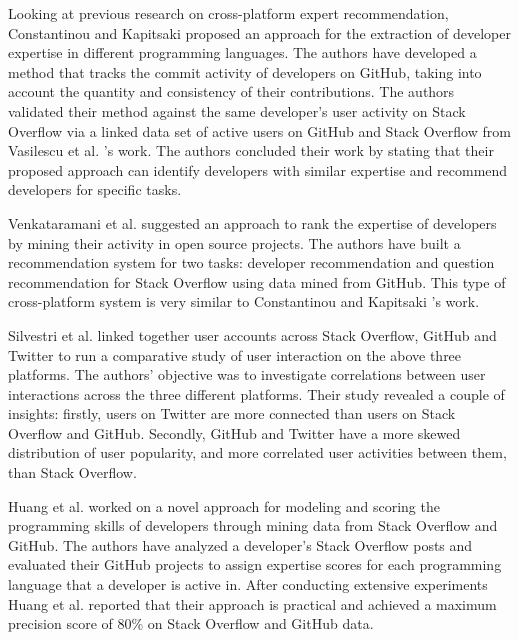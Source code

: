         Looking at previous research on cross-platform expert recommendation, Constantinou and Kapitsaki \cite{constantinou2016identifying} proposed an approach for the extraction of developer expertise in different programming languages. The authors have developed a method that tracks the commit activity of developers on GitHub, taking into account the quantity and consistency of their contributions. The authors validated their method against the same developer’s user activity on Stack Overflow via a linked data set of active users on GitHub and Stack Overflow from Vasilescu et al. \cite{vasilescu2013stackoverflow}'s work. The authors concluded their work by stating that their proposed approach can identify developers with similar expertise and recommend developers for specific tasks.
        
        Venkataramani et al. \cite{venkataramani2013discovery} suggested an approach to rank the expertise of developers by mining their activity in open source projects. The authors have built a recommendation system for two tasks: developer recommendation and question recommendation for Stack Overflow using data mined from GitHub. This type of cross-platform system is very similar to Constantinou and Kapitsaki \cite{constantinou2016identifying}'s work. 
    
        Silvestri et al. \cite{silvestri2015linking} linked together user accounts across Stack Overflow, GitHub and Twitter to run a comparative study of user interaction on the above three platforms. The authors' objective was to investigate correlations between user interactions across the three different platforms. Their study revealed a couple of insights: firstly, users on Twitter are more connected than users on Stack Overflow and GitHub. Secondly, GitHub and Twitter have a more skewed distribution of user popularity, and more correlated user activities between them, than Stack Overflow.
    
        Huang et al. \cite{huang2016cpdscorer} worked on a novel approach for modeling and scoring the programming skills of developers through mining data from Stack Overflow and GitHub. The authors have analyzed a developer's Stack Overflow posts and evaluated their GitHub projects to assign expertise scores for each programming language that a developer is active in. After conducting extensive experiments Huang et al. reported that their approach is practical and achieved a maximum precision score of 80\% on Stack Overflow and GitHub data.
        
